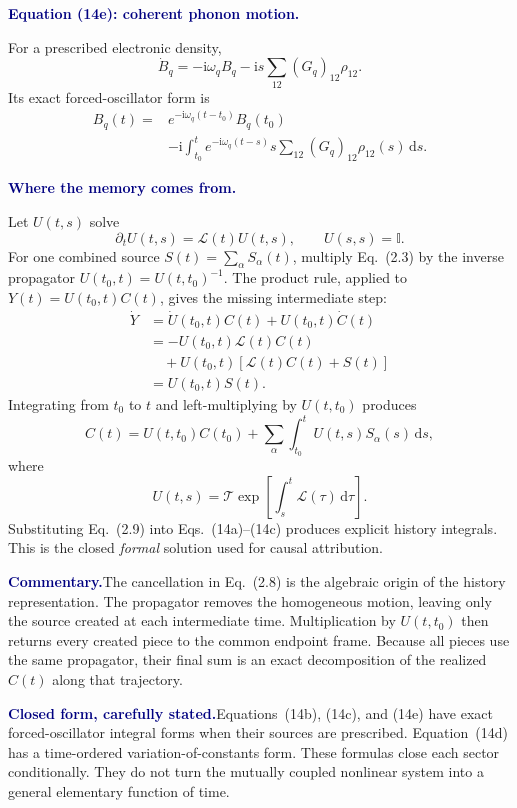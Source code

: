 \documentclass[10pt]{article}
\newcommand{\dd}{\mathrm d}
\newcommand{\ii}{\mathrm i}
\newcommand{\I}{\mathbb I}
\newcommand{\pedbox}[2]{%
  \par\medskip
  \noindent\colorbox{pale}{%
    \parbox{\dimexpr\linewidth-2\fboxsep\relax}{%
      \textcolor{navy}{\textbf{#1}}\quad #2%
    }%
  }\par\medskip
}
\newcommand{\commentarybox}[1]{\pedbox{Commentary.}{#1}}
\newcommand{\flowlead}[1]{%
  \par\medskip
  \needspace{3\baselineskip}%
  \noindent\textcolor{navy}{\textbf{#1.}}\enspace\ignorespaces
}
\begin{document}
\flowlead{Equation (14e): coherent phonon motion}

For a prescribed electronic density,
\[
\dot B_q=-\ii\omega_qB_q-\ii s\sum_{12}(G_q)_{12}\rho_{12}.
\tag{14e$'$}
\]
Its exact forced-oscillator form is
\[
\begin{aligned}
B_q(t)
={}&e^{-\ii\omega_q(t-t_0)}B_q(t_0)\\
&-\ii\int_{t_0}^{t}e^{-\ii\omega_q(t-s)}
s\sum_{12}(G_q)_{12}\rho_{12}(s)\,\dd s.
\end{aligned}
\tag{2.6}
\]

\flowlead{Where the memory comes from}

Let \(U(t,s)\) solve
\[
\partial_tU(t,s)=\mathcal L(t)U(t,s),
\qquad U(s,s)=\I.
\tag{2.7}
\]
For one combined source \(S(t)=\sum_\alpha S_\alpha(t)\), multiply
Eq.~(2.3) by the inverse propagator \(U(t_0,t)=U(t,t_0)^{-1}\).  The product
rule, applied to \(Y(t)=U(t_0,t)C(t)\), gives the missing intermediate step:
\[
\begin{aligned}
\dot Y
&=\dot U(t_0,t)C(t)+U(t_0,t)\dot C(t)\\
&=-U(t_0,t)\mathcal L(t)C(t)\\
&\quad+U(t_0,t)\!\left[\mathcal L(t)C(t)+S(t)\right]\\
&=U(t_0,t)S(t).
\end{aligned}
\tag{2.8}
\]
Integrating from \(t_0\) to \(t\) and left-multiplying by \(U(t,t_0)\)
produces
\[
C(t)=U(t,t_0)C(t_0)
+\sum_\alpha\int_{t_0}^{t}U(t,s)S_\alpha(s)\,\dd s,
\tag{2.9}
\]
where
\[
U(t,s)=\mathcal T\exp\!\left[
\int_s^t\mathcal L(\tau)\,\dd\tau
\right].
\tag{2.10}
\]
Substituting Eq.~(2.9) into Eqs.~(14a)--(14c) produces explicit history
integrals.  This is the closed \emph{formal} solution used for causal
attribution.

\commentarybox{The cancellation in Eq.~(2.8) is the algebraic origin of the
history representation.  The propagator removes the homogeneous motion,
leaving only the source created at each intermediate time.  Multiplication by
\(U(t,t_0)\) then returns every created piece to the common endpoint frame.
Because all pieces use the same propagator, their final sum is an exact
decomposition of the realized \(C(t)\) along that trajectory.}

\pedbox{Closed form, carefully stated.}{Equations~(14b), (14c), and (14e)
have exact forced-oscillator integral forms when their sources are prescribed.
Equation~(14d) has a time-ordered variation-of-constants form.  These formulas
close each sector conditionally.  They do not turn the mutually coupled
nonlinear system into a general elementary function of time.}
\end{document}
